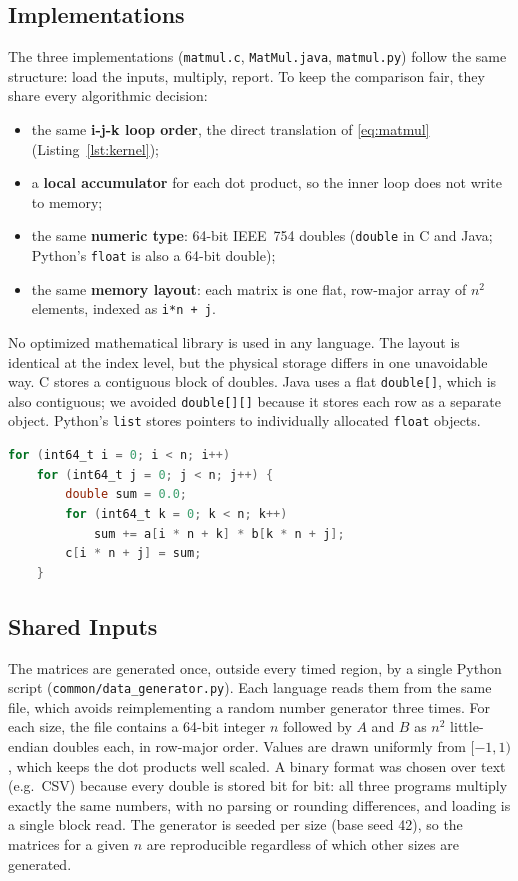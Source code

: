 \documentclass[conference,a4paper]{IEEEtran}
\newcommand{\code}[1]{\texttt{#1}}
\begin{document}
\subsection{Implementations}
The three implementations (\code{matmul.c}, \code{MatMul.java},
\code{matmul.py}) follow the same structure: load the inputs, multiply, report.
To keep the comparison fair, they share every algorithmic decision:
\begin{itemize}[itemsep=1pt]
  \item the same \textbf{i-j-k loop order}, the direct translation of
        \eqref{eq:matmul} (Listing~\ref{lst:kernel});
  \item a \textbf{local accumulator} for each dot product, so the inner loop
        does not write to memory;
  \item the same \textbf{numeric type}: 64-bit IEEE~754 doubles (\code{double}
        in C and Java; Python's \code{float} is also a 64-bit double);
  \item the same \textbf{memory layout}: each matrix is one flat, row-major
        array of $n^2$ elements, indexed as \code{i*n + j}.
\end{itemize}
No optimized mathematical library is used in any language. The layout is
identical at the index level, but the physical storage differs in one
unavoidable way. C stores a contiguous block of doubles. Java uses a flat
\code{double[]}, which is also contiguous; we avoided \code{double[][]}
because it stores each row as a separate object. Python's \code{list} stores
pointers to individually allocated \code{float} objects.

\begin{lstlisting}[language=C, caption={Multiplication kernel (C version; the Java and Python kernels are line-by-line equivalent).}, label=lst:kernel, captionpos=b]
for (int64_t i = 0; i < n; i++)
    for (int64_t j = 0; j < n; j++) {
        double sum = 0.0;
        for (int64_t k = 0; k < n; k++)
            sum += a[i * n + k] * b[k * n + j];
        c[i * n + j] = sum;
    }
\end{lstlisting}

\subsection{Shared Inputs}
The matrices are generated once, outside every timed region, by a single
Python script (\code{common/\allowbreak data\_\allowbreak generator.py}). Each language reads them from
the same file, which avoids reimplementing a random number generator three
times. For each size, the file contains a 64-bit integer $n$ followed by $A$
and $B$ as $n^2$ little-endian doubles each, in row-major order. Values are
drawn uniformly from $[-1, 1)$, which keeps the dot products well scaled. A
binary format was chosen over text (e.g.\ CSV) because every double is stored
bit for bit: all three programs multiply exactly the same numbers, with no
parsing or rounding differences, and loading is a single block read. The
generator is seeded per size (base seed 42), so the matrices for a given $n$
are reproducible regardless of which other sizes are generated.
\end{document}
